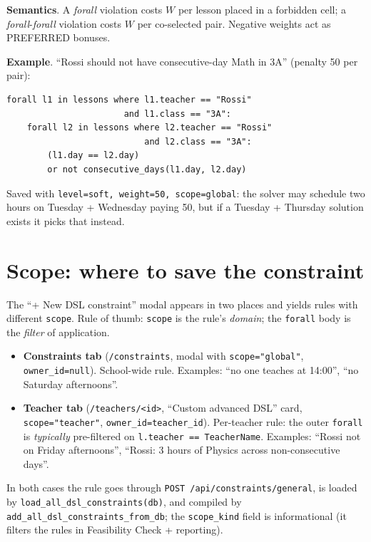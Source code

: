 \textbf{Semantics}. A \emph{forall} violation costs $W$ per
lesson placed in a forbidden cell; a
\emph{forall}-\emph{forall} violation costs $W$ per
co-selected pair. Negative weights act as PREFERRED bonuses.

\textbf{Example}. ``Rossi should not have consecutive-day Math
in 3A'' (penalty 50 per pair):
\begin{lstlisting}
forall l1 in lessons where l1.teacher == "Rossi"
                       and l1.class == "3A":
    forall l2 in lessons where l2.teacher == "Rossi"
                           and l2.class == "3A":
        (l1.day == l2.day)
        or not consecutive_days(l1.day, l2.day)
\end{lstlisting}
Saved with \texttt{level=soft, weight=50, scope=global}: the
solver may schedule two hours on Tuesday + Wednesday paying
50, but if a Tuesday + Thursday solution exists it picks that
instead.

\section{Scope: where to save the constraint}
\label{sec:dsl-scope-en}

The ``+ New DSL constraint'' modal appears in two places and
yields rules with different \texttt{scope}. Rule of thumb:
\texttt{scope} is the rule's \emph{domain}; the \texttt{forall}
body is the \emph{filter} of application.

\begin{itemize}
\item \textbf{Constraints tab} (\texttt{/constraints}, modal
  with \texttt{scope="global"}, \texttt{owner\_id=null}).
  School-wide rule. Examples: ``no one teaches at 14:00'',
  ``no Saturday afternoons''.

\item \textbf{Teacher tab} (\texttt{/teachers/<id>}, ``Custom
  advanced DSL'' card, \texttt{scope="teacher"},
  \texttt{owner\_id=teacher\_id}). Per-teacher rule: the outer
  \texttt{forall} is \emph{typically} pre-filtered on
  \texttt{l.teacher == TeacherName}. Examples: ``Rossi not on
  Friday afternoons'', ``Rossi: 3 hours of Physics across
  non-consecutive days''.
\end{itemize}

In both cases the rule goes through
\texttt{POST /api/constraints/general}, is loaded by
\texttt{load\_all\_dsl\_constraints(db)}, and compiled by
\texttt{add\_all\_dsl\_constraints\_from\_db}; the
\texttt{scope\_kind} field is informational (it filters the
rules in Feasibility Check + reporting).


